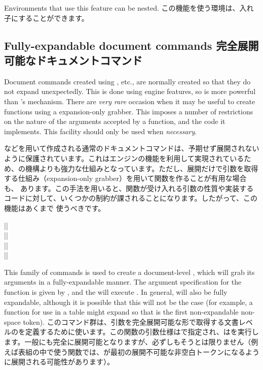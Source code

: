 \documentclass{ltxguide}
\newcommand\jpnewline{\vspace{3pt}\newline}
\DeclareRobustCommand{\jpemph}[1]{%
  \underLine{#1}%
}
\begin{document}
Environments that use this feature can be nested.
\jpnewline
この機能を使う環境は、入れ子にすることができます。

\subsection{Fully-expandable document commands
完全展開可能なドキュメントコマンド}\label{sec:ltcmd:expandable}

Document commands created using , etc.\@, are normally
created so that they do not expand unexpectedly. This is done using engine
features, so is more powerful than \LaTeXe{}'s  mechanism. There
are \emph{very rare} occasion when it may be useful to create functions using a
expansion-only grabber. This imposes a number of restrictions on the
nature of the arguments accepted by a function, and the code it implements.
This facility should only be used when \emph{necessary}.

などを用いて作成される通常のドキュメントコマンドは、予期せず展開されないように保護されています。これはエンジンの機能を利用して実現されているため、\LaTeXe{}の機構よりも強力な仕組みとなっています。ただし、展開だけで引数を取得する仕組み（expansion-only grabber）を用いて関数を作ることが有用な場合も、\jpemph{ごくまれに}あります。この手法を用いると、関数が受け入れる引数の性質や実装するコードに対して、いくつかの制約が課されることになります。したがって、この機能はあくまで\jpemph{必要な場合にのみ}使うべきです。

\begin{decl}
  |\NewExpandableDocumentCommand|        \\
  |\RenewExpandableDocumentCommand|      \\
  |\ProvideExpandableDocumentCommand|    \\
  |\DeclareExpandableDocumentCommand|   
\end{decl}
This family of commands is used to create a document-level ,
which will grab its arguments in a fully-expandable manner. The
argument specification for the function is given by ,
and the  will execute . In  general,  will
also be fully expandable, although it is possible that this will
not be the case (for example, a function for use in a table might
expand so that  is the first non-expandable non-space token).
\jpnewline
このコマンド群は、引数を完全展開可能な形で取得する文書レベルのを定義するために使います。この関数の引数仕様はで指定され、はを実行します。一般にも完全に展開可能となりますが、必ずしもそうとは限りません（例えば表組の中で使う関数では、が最初の展開不可能な非空白トークンになるように展開される可能性があります）。
\end{document}
